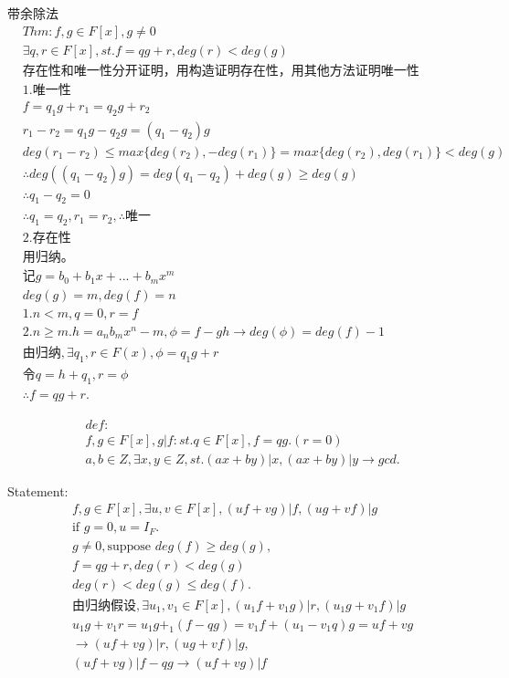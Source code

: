 \documentclass[12pt, a4paper]{article}  %
\begin{document}
带余除法
\begin{align}
    &Thm:f,g\in F[x],g\neq 0\\
    &\exists q,r\in F[x],st. f=qg+r,deg(r)<deg(g)\\
    &\text{存在性和唯一性分开证明，用构造证明存在性，用其他方法证明唯一性}\\
    &1.\text{唯一性}\\
    &f=q_1g+r_1=q_2g+r_2\\
    &r_1-r_2=q_1g-q_2g=(q_1-q_2)g\\
    &deg(r_1-r_2)\leqslant max\{deg(r_2),-deg(r_1)\}= max\{deg(r_2),deg(r_1)\}<deg(g)\\
    &\therefore deg((q_1-q_2)g)=deg(q_1-q_2)+deg(g)\geqslant deg(g)\\
    &\therefore q_1-q_2=0\\
    &\therefore q_1=q_2,r_1=r_2,\therefore \text{唯一}\\
    &2.\text{存在性}\\
    &\text{用归纳。}\\
    &\text{记}g=b_0+b_1x+...+b_mx^m\\
    &deg(g)=m,deg(f)=n\\
    &1.n<m,q=0,r=f\\
    &2.n\geqslant m.h=a_nb_mx^n-m,\phi=f-gh\rightarrow deg(\phi)=deg(f)-1\\
    &\text{由归纳},\exists q_1,r\in F(x),\phi=q_1g+r\\
    &\text{令}q=h+q_1,r=\phi\\
    &\therefore f=qg+r.
\end{align}

\begin{align}
    &def:\\
    &f,g\in F[x],g|f: st. q\in F[x],f=qg.(r=0)\\
    &a,b\in Z,\exists x,y\in Z,st. (ax+by)|x,(ax+by)|y\rightarrow gcd.
\end{align}

Statement:
\begin{align}
    &f,g\in F[x],\exists u,v\in F[x],(uf+vg)|f,(ug+vf)|g\\
    &\text{if } g=0,u=I_F.\\
    &g\neq 0,\text{suppose }deg(f)\geqslant deg(g),\\
    &f=qg+r,deg(r)<deg(g)\\
    &deg(r)<deg(g)\leqslant deg(f).\\
    &\text{由归纳假设},\exists u_1,v_1\in F[x],(u_1f+v_1g)|r,(u_1g+v_1f)|g\\
    &u_1g+v_1r=u_1g+_1(f-qg)=v_1f+(u_1-v_1q)g=uf+vg\\
    &\rightarrow (uf+vg)|r,(ug+vf)|g,\\
    &(uf+vg)|f-qg\rightarrow (uf+vg)|f
\end{align}
\end{document}
